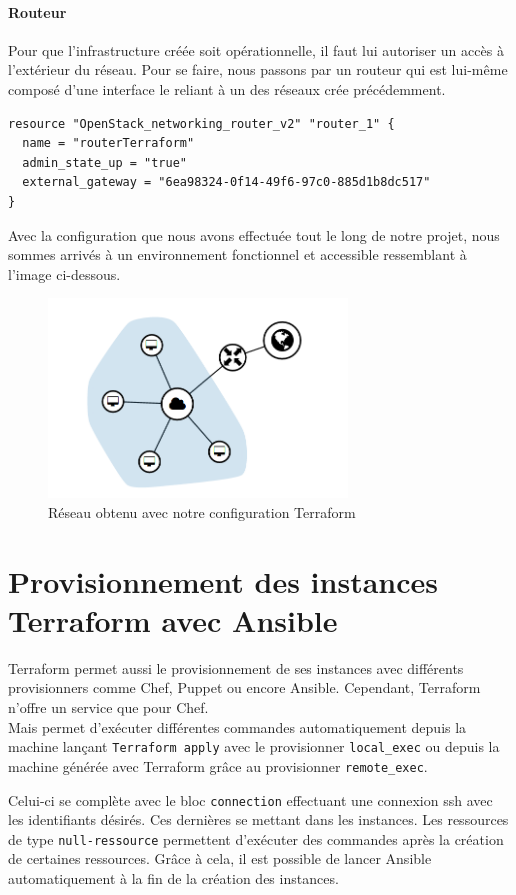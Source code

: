 \documentclass[]{article}
\let\oldparagraph\paragraph
\renewcommand{\paragraph}[1]{\oldparagraph{#1}\mbox{}}
\begin{document}
\paragraph{Routeur}\label{routeur}
Pour que l'infrastructure créée soit opérationnelle, il faut lui
autoriser un accès à l'extérieur du réseau. Pour se faire, nous passons
par un routeur qui est lui-même composé d'une interface le reliant à un
des réseaux crée précédemment.
\begin{verbatim}
resource "OpenStack_networking_router_v2" "router_1" {
  name = "routerTerraform"
  admin_state_up = "true"
  external_gateway = "6ea98324-0f14-49f6-97c0-885d1b8dc517"
}
\end{verbatim}
\vspace{1cm}
Avec la configuration que nous avons effectuée tout le long de notre projet, nous sommes arrivés à un environnement fonctionnel et accessible ressemblant à l'image ci-dessous.
\begin{figure}
\centering
\includegraphics[height=200px]{Images/reseau.png}
\caption{Réseau obtenu avec notre configuration Terraform}
\end{figure}

\newpage
\section{Provisionnement des instances Terraform avec Ansible}\label{provisionnement}
Terraform permet aussi le provisionnement de ses instances avec
différents provisionners comme Chef, Puppet ou encore Ansible.
Cependant, Terraform n'offre un service que pour Chef.\\
 Mais permet d'exécuter différentes commandes automatiquement depuis la machine
lançant \texttt{Terraform\ apply} avec le provisionner
\texttt{local\_exec} ou depuis la machine générée avec Terraform grâce
au provisionner \texttt{remote\_exec}. 

Celui-ci se complète avec le bloc
\texttt{connection} effectuant une connexion ssh avec les identifiants
désirés. Ces dernières se mettant dans les instances. Les ressources de
type \texttt{null-ressource} permettent d'exécuter des commandes après
la création de certaines ressources. Grâce à cela, il est possible de
lancer Ansible automatiquement à la fin de la création des instances.
\end{document}
